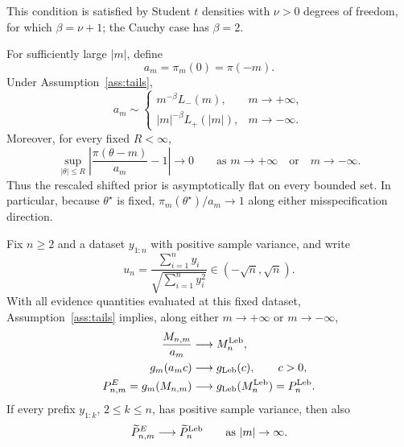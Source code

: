 This condition is satisfied by Student \(t\) densities with
\(\nu>0\) degrees of freedom, for which \(\beta=\nu+1\); the Cauchy
case has \(\beta=2\).

For sufficiently large \(\lvert m\rvert\), define
\begin{equation}
\label{eq:am-def}
  a_m
  =
  \pi_m(0)
  =
  \pi(-m).
\end{equation}
Under Assumption~\ref{ass:tails},
\begin{equation}
\label{eq:am-asymptotics}
  a_m
  \sim
  \begin{cases}
    m^{-\beta}L_-(m),
      &m\to+\infty,\\[3pt]
    \lvert m\rvert^{-\beta}L_+(\lvert m\rvert),
      &m\to-\infty.
  \end{cases}
\end{equation}
Moreover, for every fixed \(R<\infty\),
\begin{equation}
\label{eq:prior-local-flattening}
  \sup_{\lvert\theta\rvert\leq R}
  \left\lvert
    \frac{\pi(\theta-m)}{a_m}-1
  \right\rvert
  \longrightarrow0
  \qquad\text{as }m\to+\infty
  \quad\text{or}\quad
  m\to-\infty.
\end{equation}
Thus the rescaled shifted prior is asymptotically flat on every bounded
set.  In particular, because \(\theta^\star\) is fixed,
\(\pi_m(\theta^\star)/a_m\to1\) along either misspecification
direction.

\begin{theorem}
\label{thm:recovery}
Fix \(n\geq2\) and a dataset \(y_{1:n}\) with positive sample
variance, and write
\[
  u_n
  =
  \frac{\sum_{i=1}^n y_i}
       {\sqrt{\sum_{i=1}^n y_i^2}}
  \in(-\sqrt n,\sqrt n).
\]
With all evidence quantities evaluated at this fixed dataset,
Assumption~\ref{ass:tails} implies, along either
\(m\to+\infty\) or \(m\to-\infty\),
\begin{align}
  \frac{M_{n,m}}{a_m}
  &\longrightarrow
  M_n^{\mathrm{Leb}},
  \label{eq:Mnm-asymp}\\
  g_m(a_m c)
  &\longrightarrow
  g_{\mathrm{Leb}}(c),
  \qquad c>0,
  \label{eq:gm-asymp}\\
  P_{n,m}^E
  =
  g_m(M_{n,m})
  &\longrightarrow
  g_{\mathrm{Leb}}(M_n^{\mathrm{Leb}})
  =
  P_n^{\mathrm{Leb}}.
  \label{eq:p-asymp}
\end{align}
If every prefix \(y_{1:k}\), \(2\leq k\leq n\), has positive sample
variance, then also
\begin{equation}
\label{eq:running-p-asymp}
  \widetilde P_{n,m}^E
  \longrightarrow
  \widetilde P_n^{\mathrm{Leb}}
  \qquad\text{as }|m|\to\infty.
\end{equation}
\end{theorem}

